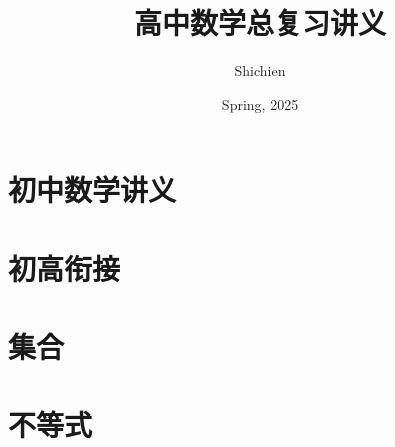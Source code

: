 \documentclass[lang=cn,10pt,color=cyan,titlestyle=hang,device=normal]{elegantbook}
\title{高中数学总复习讲义}
\author{Shichien}
\institute{软件工程学院, ECNU}
\date{Spring, 2025}
\begin{document}
\maketitle
\frontmatter
\tableofcontents
\mainmatter

% 

% 

\chapter{初中数学讲义}


\chapter{初高衔接}






\chapter{集合}









\chapter{不等式}








\end{document}
